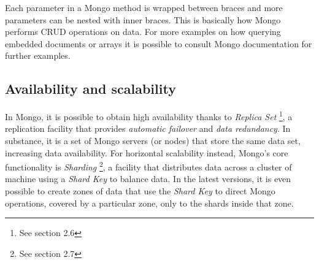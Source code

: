 Each parameter in a Mongo method is wrapped between {} braces and more parameters can be nested with inner {} braces. 
This is basically how Mongo performs CRUD operations on data. For more examples on how querying embedded documents or arrays it is possible to consult Mongo documentation for further examples.

\subsection {Availability and scalability}
In Mongo, it is possible to obtain high availability thanks to \textit{Replica Set} \footnote{See section 2.6}, a replication facility that provides \textit{automatic failover} and \textit{data redundancy}. In substance, it is a set of Mongo servers (or nodes) that store the same data set, increasing data availability.
For horizontal scalability instead, Mongo’s core functionality is \textit{Sharding} \footnote{See section 2.7}, a facility that distributes data across a cluster of machine using a \textit{Shard Key} to balance data. In the latest versions, it is even possible to create zones of data that use the \textit{Shard Key} to direct Mongo operations, covered by a particular zone, only to the shards inside that zone.

